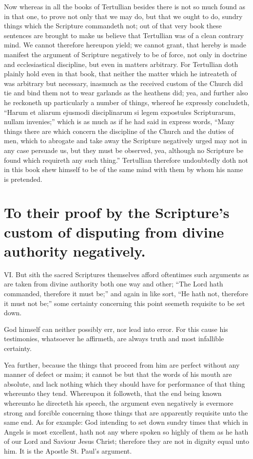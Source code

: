 Now whereas in all the books of Tertullian besides there is not so much found as in that one, to prove not only that we may do, but that we ought to do, sundry things which the Scripture commandeth not; out of that very book these sentences are brought to make us believe that Tertullian was of a clean contrary mind. We cannot therefore hereupon yield; we cannot grant, that hereby is made manifest the argument of Scripture negatively to be of force, not only in doctrine and ecclesiastical discipline, but even in matters arbitrary. For Tertullian doth plainly hold even in that book, that neither the matter which he intreateth of was arbitrary but necessary, inasmuch as the received custom of the Church  did tie and bind them not to wear garlands as the heathens did; yea, and further also he reckoneth up particularly a number of things, whereof he expressly concludeth, “Harum et aliarum ejusmodi disciplinarum si legem expostules Scripturarum, nullam invenies;” which is as much as if he had said in express words, “Many things there are which concern the discipline of the Church and the duties of men, which to abrogate and take away the Scripture negatively urged may not in any case persuade us, but they must be observed, yea, although no Scripture be found which requireth any such thing.” Tertullian therefore undoubtedly doth not in this book shew himself to be of the same mind with them by whom his name is pretended.

\section*{To their proof by the Scripture’s custom of disputing from divine authority negatively.}

VI. But sith the sacred Scriptures themselves afford oftentimes such arguments as are taken from divine authority both one way and other; “The Lord hath commanded, therefore it must be;” and again in like sort, “He hath not, therefore it must not be;” some certainty concerning this point seemeth requisite to be set down.

God himself can neither possibly err, nor lead into error.  For this cause his testimonies, whatsoever he affirmeth, are always truth and most infallible certainty.

Yea further, because the things that proceed from him are perfect without any manner of defect or maim; it cannot be but that the words of his mouth are absolute, and lack nothing which they should have for performance of that thing whereunto they tend. Whereupon it followeth, that the end being known whereunto he directeth his speech, the argument even negatively is evermore strong and forcible concerning those things that are apparently requisite unto the same end. As for example: God intending to set down sundry times that which in Angels is most excellent, hath not any where spoken so highly of them as he hath of our Lord and Saviour Jesus Christ; therefore they are not in dignity equal unto him. It is the Apostle St. Paul’s argument.

